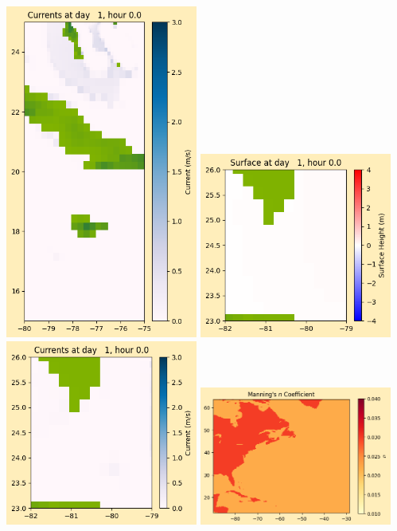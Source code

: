 \documentclass[11pt]{article}
\begin{document}
\includegraphics[width=0.475\textwidth]{frame0016fig1008.png}
\vskip 10pt 
\includegraphics[width=0.475\textwidth]{frame0016fig1009.png}
\includegraphics[width=0.475\textwidth]{frame0016fig1010.png}
\vskip 10pt 
\includegraphics[width=0.475\textwidth]{frame0016fig1011.png}
\end{document}
